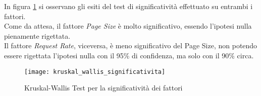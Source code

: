 In figura \ref{kruskal_wallis_significativita} si osservano gli esiti del test
di significatività effettuato su entrambi i fattori.\\
Come da attesa, il fattore \textit{Page Size} è molto significativo,
essendo l'ipotesi nulla pienamente rigettata.\\
Il fattore \textit{Request Rate}, viceversa, è meno significativo
del Page Size, non potendo essere rigettata l'ipotesi nulla con il 95\% di
confidenza, ma solo con il 90\% circa.\\

\begin{figure}[!htbp]
  \centering
  \texttt{[image: kruskal\_wallis\_significativita]}
  \caption{Kruskal-Wallis Test per la significatività dei fattori}
  \label{kruskal_wallis_significativita}
\end{figure}
